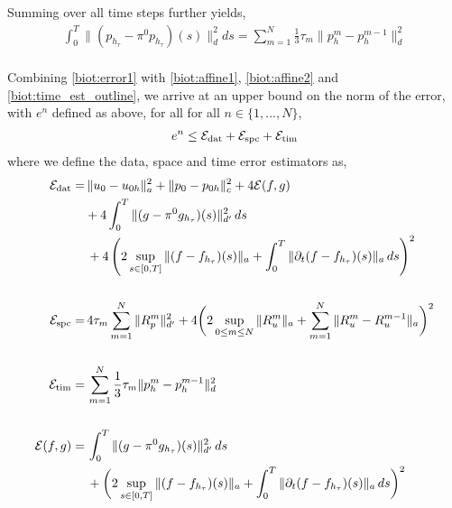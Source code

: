 Summing over all time steps further yields,
\begin{align} \label{biot:time_est_outline}
\int_0^{T} \|(p_{h_\tau}-\pi^0p_{h_\tau})(s)\|_d^2 ds = \sum_{m=1}^N \frac{1}{3}\tau_m \| p_h^m - p_h^{m-1}\|_d^2
\end{align}
\\
Combining \eqref{biot:error1} with \eqref{biot:affine1}, \eqref{biot:affine2} and \eqref{biot:time_est_outline}, we arrive at an upper bound on the norm of the error, with $e^n$ defined as above, for all for all $n \in \{1,...,N\}$,
\begin{align} \label{biot_final_up_bd}
e^n \leq \mathcal{E}_{\textnormal{dat}} + \mathcal{E}_{\textnormal{spc}} + \mathcal{E}_{\textnormal{tim}} 
\end{align}
where we define the data, space and time error estimators as,
\begin{align} \label{biot:est_dat}
\mathcal{E}_{\textnormal{dat}} = & \, \|u_0 - u_{0 h} \|^2_a + \|p_0 - p_{0 h} \|^2_c + 4\mathcal{E}(f,g) \\
& + 4 \int_0^{T} \|(g-\pi^0g_{h_\tau})(s)\|^2_{d'}\, ds \notag\\
& \, + 4\left( 2 \sup_{s \in [0,T]} \| (f - f_{h_\tau})(s)\|_a + \int_0^{T} \| \partial_t (f - f_{h_\tau})(s)\|_a \, ds \right)^2 \notag\\
\notag\\
\mathcal{E}_{\textnormal{spc}} = & \,  4 \tau_m\sum_{m=1}^N \| R_p^m\|^2_{d'} + 4\biggl(2 \sup_{0 \leq m \leq N} \| R_u^m\|_a + \sum_{m=1}^N \| R_u^m - R_u^{m-1}\|_a \biggr)^2 \label{biot:est_spc}\\
\notag\\
\mathcal{E}_{\textnormal{tim}} = & \, \sum_{m=1}^N \frac{1}{3}\tau_m \|p^m_h - p^{m-1}_h\|_d^2 \label{biot:est_tim}\\
\notag\\
\mathcal{E}(f,g) = & \, \int_0^{T}  \|(g-\pi^0g_{h_\tau})(s)\|^2_{d'} \, ds \notag \\
& \, + \biggl( 2 \sup_{s \in [0,T]} \| (f - f_{h_\tau})(s)\|_a + \int_0^{T} \| \partial_t (f - f_{h_\tau})(s)\|_a \, ds \biggr)^2 \notag
\end{align}

